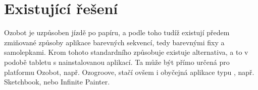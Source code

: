 \section{Existující řešení}
    Ozobot je uzpůsoben jízdě po papíru, a podle toho tudíž existují předem zmiňované způsoby aplikace barevných sekvencí, tedy barevnými fixy a samolepkami. Krom tohoto standardního způsobuje existuje alternativa, a to v podobě tabletu s nainstalovanou aplikací. Ta může být přímo určená pro platformu Ozobot, např. Ozogroove, stačí ovšem i obyčejná aplikace typu , např. Sketchbook, nebo Infinite Painter.
    
